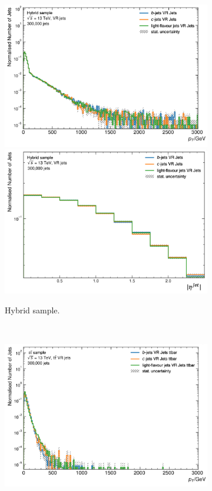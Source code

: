 \begin{figure}[h!]
  \centering
  \begin{subfigure}[b]{0.98\textwidth}
      \centering
      \includegraphics[scale=0.45]{Images/FTAG/VRDips/JetDist/hspt.png}
      \includegraphics[scale=0.45]{Images/FTAG/VRDips/JetDist/hseta.png}
      \caption{Hybrid sample.} 
      \label{fig:vrjetdisth}
  \end{subfigure}\\
  \begin{subfigure}[b]{0.98\textwidth}
      \centering
      \includegraphics[scale=0.45]{Images/FTAG/VRDips/JetDist/ttpt.png}

\end{subfigure}
\end{figure}
